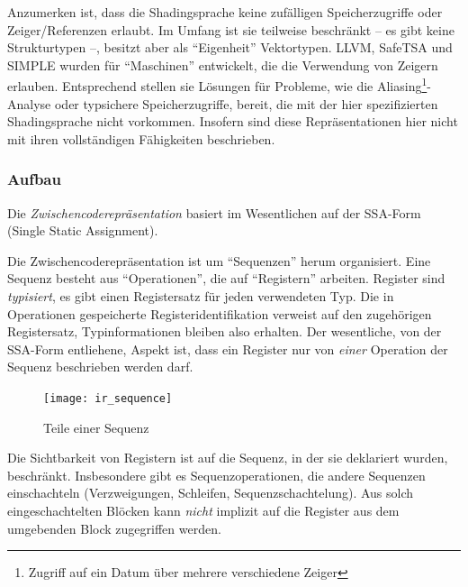 \documentclass[twoside,a4paper,fleqn,12pt]{article}
\begin{document}
Anzumerken ist, dass die Shadingsprache keine zufälligen Speicherzugriffe oder Zeiger/Referenzen erlaubt.
Im Umfang ist sie teilweise beschränkt -- es gibt keine Strukturtypen --, besitzt aber als "`Eigenheit"' Vektortypen.
LLVM, SafeTSA und SIMPLE wurden für "`Maschinen"' entwickelt, die die Verwendung von Zeigern erlauben. Entsprechend
stellen sie Lösungen für Probleme, wie die Aliasing\footnote{Zugriff auf ein Datum über mehrere verschiedene Zeiger}-Analyse oder typsichere Speicherzugriffe, bereit, die mit
der hier spezifizierten Shadingsprache nicht vorkommen. Insofern sind diese Repräsentationen hier nicht
mit ihren vollständigen Fähigkeiten beschrieben.

\subsubsection{Aufbau}

Die \emph{Zwischencoderepräsentation} basiert im Wesentlichen auf der SSA-Form (Single Static Assignment).


Die Zwischencoderepräsentation ist um "`Sequenzen"' herum organisiert. Eine Sequenz besteht aus "`Operationen"',
die auf "`Registern"' arbeiten. Register sind \emph{typisiert}, es gibt einen Registersatz für jeden verwendeten Typ.
Die in Operationen gespeicherte Registeridentifikation verweist auf den zugehörigen Registersatz, Typinformationen bleiben also erhalten.
Der wesentliche, von der SSA-Form entliehene, Aspekt ist, dass ein Register nur von \emph{einer} Operation der Sequenz beschrieben werden darf.

\begin{figure}[h]
   \centering
  \texttt{[image: ir\_sequence]}
  \caption{Teile einer Sequenz}
  \label{fig:ir_sequence}
\end{figure}

Die Sichtbarkeit von Registern ist auf die Sequenz, in der sie deklariert wurden, beschränkt.
Insbesondere gibt es Sequenzoperationen, die andere Sequenzen einschachteln (Verzweigungen, Schleifen, Sequenzschachtelung).
Aus solch eingeschachtelten Blöcken kann \emph{nicht} implizit auf die Register aus dem umgebenden Block
zugegriffen werden.
\end{document}
